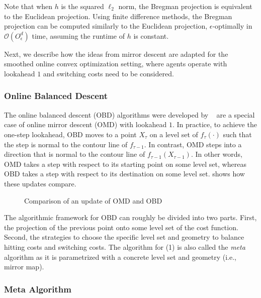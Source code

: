 Note that when $h$ is the squared $\ell_2$ norm, the Bregman projection is equivalent to the Euclidean projection. Using finite difference methods, the Bregman projection can be computed similarly to the Euclidean projection, $\epsilon$-optimally in $\mathcal{O}(O_{\epsilon}^d)$ time, assuming the runtime of $h$ is constant.

Next, we describe how the ideas from mirror descent are adapted for the smoothed online convex optimization setting, where agents operate with lookahead $1$ and switching costs need to be considered.

\subsubsection{Online Balanced Descent}\label{section:online_algorithms:md:descent_methods:obd}

The online balanced descent (OBD) algorithms were developed by \citeauthor*{Goel2018}~\cite{Goel2018} are a special case of online mirror descent (OMD) with lookahead $1$. In practice, to achieve the one-step lookahead, OBD moves to a point $X_{\tau}$ on a level set of $f_{\tau}(\cdot)$ such that the step is normal to the contour line of $f_{\tau-1}$. In contrast, OMD steps into a direction that is normal to the contour line of $f_{\tau-1}(X_{\tau-1})$. In other words, OMD takes a step with respect to its starting point on some level set, whereas OBD takes a step with respect to its destination on some level set.  shows how these updates compare.

\begin{figure}
    \centering
    [TODO]
    \caption{Comparison of an update of OMD and OBD}
    \label{fig:comparison_of_an_update_of_omd_and_obd}
\end{figure}

The algorithmic framework for OBD can roughly be divided into two parts. First, the projection of the previous point onto some level set of the cost function.  Second, the strategies to choose the specific level set and geometry to balance hitting costs and switching costs. The algorithm for (1) is also called the \emph{meta} algorithm as it is parametrized with a concrete level set and geometry (i.e., mirror map).

\subsubsection{Meta Algorithm}

